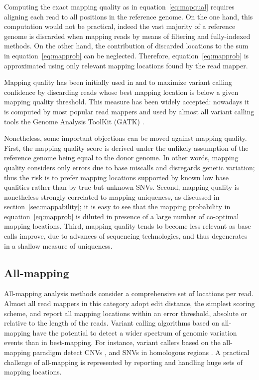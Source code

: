 Computing the exact mapping quality as in equation~\ref{eq:mapqual} requires aligning each read to all positions in the reference genome.
On the one hand, this computation would not be practical, indeed the vast majority of a reference genome is discarded when mapping reads by means of filtering and fully-indexed methods.
On the other hand, the contribution of discarded locations to the sum in equation~\ref{eq:mapprob} can be neglected.
Therefore, equation~\ref{eq:mapprob} is approximated using only relevant mapping locations found by the read mapper.

Mapping quality has been initially used in \citep{Li2008} and \citep{Li2009} to maximize variant calling confidence by discarding reads whose best mapping location is below a given mapping quality threshold.
This measure has been widely accepted: nowadays it is computed by most popular read mappers and used by almost all variant calling tools \eg the Genome Analysis ToolKit (GATK) \citep{DePristo2011}.

Nonetheless, some important objections can be moved against mapping quality.
First, the mapping quality score is derived under the unlikely assumption of the reference genome being equal to the donor genome.
In other words, mapping quality considers only errors due to base miscalls and disregards genetic variation; thus the risk is to prefer mapping locations supported by known low base qualities rather than by true but unknown SNVs.
Second, mapping quality is nonetheless strongly correlated to mapping uniqueness, as discussed in section~\ref{sec:mappability}; it is easy to see that the mapping probability in equation~\ref{eq:mapprob} is diluted in presence of a large number of co-optimal mapping locations.
Third, mapping quality tends to become less relevant as base calls improve, due to advances of sequencing technologies, and thus degenerates in a shallow measure of uniqueness.

\subsection{All-mapping}
All-mapping analysis methods consider a comprehensive set of locations per read.
Almost all read mappers in this category adopt edit distance, the simplest scoring scheme, and report all mapping locations within an error threshold, absolute or relative \wrt to the length of the reads.
Variant calling algorithms based on all-mapping have the potential to detect a wider spectrum of genomic variation events than in best-mapping.
For instance, variant callers based on the all-mapping paradigm detect CNVs \citep{Alkan2009}, and SNVs in homologous regions \citep{Simola2011}.
A practical challenge of all-mapping is represented by reporting and handling huge sets of mapping locations.

